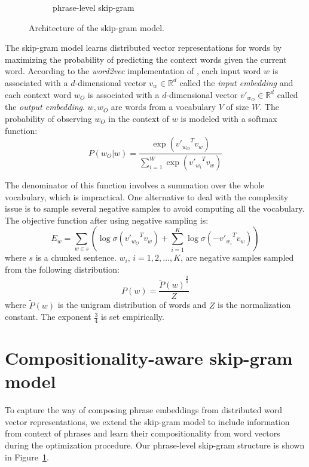 \begin{figure}
\begin{subfigure}[b]{0.55\textwidth}
    \caption{phrase-level skip-gram}
    \label{fig:1b}
\end{subfigure}
\caption{\small{Architecture of the skip-gram model.}}
\label{fig:skip-gram}
\vspace{-1em}
\end{figure}
The skip-gram model learns distributed vector representations for words by maximizing the probability of predicting
the context words given the current word. According to the \textit{word2vec} implementation of , 
each input word $w$ is associated with a $d$-dimensional vector $v_w \in {\mathbb{R}}^{d}$ called the \textit{input embedding} and 
each context word $w_O$ is associated with a $d$-dimensional vector $v'_{w_O} \in {\mathbb{R}}^{d}$ called the \textit{output embedding}. $w, w_O$ are words from a vocabulary $V$
of size $W$. The probability of observing $w_O$ in the context of $w$ is modeled with a softmax function:
\begin{equation}
P(w_O | w) = \frac{\exp({v'_{w_O}}^T v_w)}{\sum_{i=1}^W \exp({v'_{w_i}}^T v_w)}
\end{equation}


The denominator of this function involves a summation over the whole vocabulary, which is impractical. One alternative 
to deal with the complexity issue is to sample several negative samples to avoid computing all the vocabulary. The objective
function after using negative sampling is:
\begin{equation}
    E_w = \sum_{w \in s} (\log \sigma ({v'_{w_O}}^T v_w) + \sum_{i=1}^{K} \log \sigma (-{v'_{w_i}}^T v_w))
\end{equation}
where $s$ is a chunked sentence. $w_i$, $i=1, 2, \ldots ,K$, are negative samples sampled from the following distribution:
\begin{equation}
P(w) = \frac{{\widetilde{P}(w)}^{\frac{3}{4}}}{Z}
\end{equation}
where $\widetilde{P}(w)$ is the unigram distribution of words and $Z$ is the normalization constant. The exponent $\frac{3}{4}$ is 
set empirically.
\section{Compositionality-aware skip-gram model}
\label{sec:compose}
To capture the way of composing phrase embeddings from distributed word vector representations, we extend the skip-gram model to include information from 
context of phrases and learn their compositionality from word vectors during the optimization procedure. Our phrase-level skip-gram structure is shown in
Figure~\ref{fig:1b}. 
